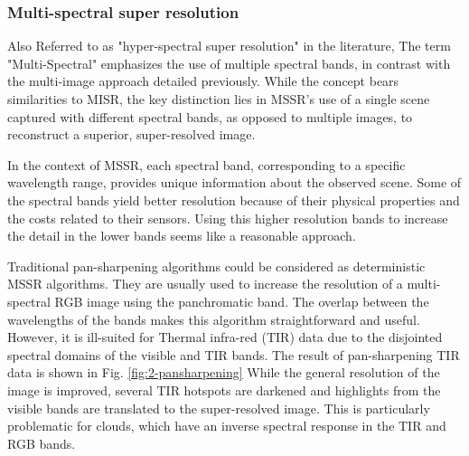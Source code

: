         \subsubsection{Multi-spectral super resolution}

        Also Referred to as "hyper-spectral super resolution" in the literature, The term "Multi-Spectral" emphasizes the use of multiple spectral bands, in contrast with the multi-image approach detailed previously. While the concept bears similarities to MISR, the key distinction lies in MSSR's use of a single scene captured with different spectral bands, as opposed to multiple images, to reconstruct a superior, super-resolved image.

        In the context of MSSR, each spectral band, corresponding to a specific wavelength range, provides unique information about the observed scene. Some of the spectral bands yield better resolution because of their physical properties and the costs related to their sensors. Using this higher resolution bands to increase the detail in the lower bands seems like a reasonable approach.

        Traditional pan-sharpening algorithms could be considered as deterministic MSSR  algorithms. They are usually used to increase the resolution of a multi-spectral RGB image using the panchromatic band. The overlap between the wavelengths of the bands makes this algorithm straightforward and useful. However, it is ill-suited for Thermal infra-red (TIR) data due to the disjointed spectral domains of the visible and TIR bands.
        The result of pan-sharpening TIR data is shown in Fig. \ref{fig:2-pansharpening}  While the general resolution of the image is improved, several TIR hotspots are darkened and highlights from the visible bands are translated to the super-resolved image. This is particularly problematic for clouds, which have an inverse spectral response in the TIR and RGB bands. 
        

